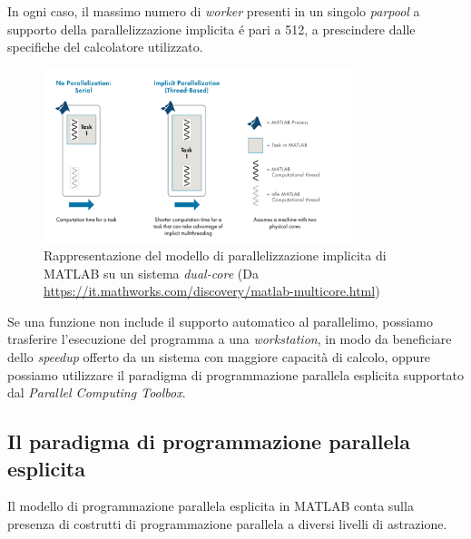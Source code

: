 In ogni caso, il massimo numero di \textit{worker} presenti in un singolo \textit{parpool} a supporto della parallelizzazione implicita \'e pari a 512, a prescindere dalle specifiche del calcolatore utilizzato.
\begin{figure}[htbp]
    \centering
    \includegraphics[width=0.8\textwidth]{../Immagini/Capitolo 2/ImplicitParallelization.png}
    \caption{Rappresentazione del modello di parallelizzazione implicita di MATLAB su un sistema \textit{dual-core} \small{(Da \url{https://it.mathworks.com/discovery/matlab-multicore.html})}}
    \label{fig:ParallelismoImplicito}
\end{figure}\newline
Se una funzione non include il supporto automatico al parallelimo, possiamo trasferire l'esecuzione del programma a una \textit{workstation}, in modo da beneficiare dello \textit{speedup} offerto da un sistema con maggiore capacit\`a di calcolo, oppure possiamo utilizzare il paradigma di programmazione parallela esplicita supportato dal \textit{Parallel Computing Toolbox}.

\subsection{Il paradigma di programmazione parallela esplicita}

Il modello di programmazione parallela esplicita in MATLAB conta sulla presenza di costrutti di programmazione parallela a diversi livelli di astrazione.